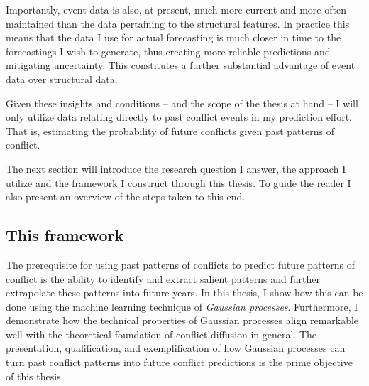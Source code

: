 \documentclass[a4paper]{article}
\begin{document}
Importantly, event data is also, at present, much more current and more often maintained than the data pertaining to the structural features. In practice this means that the data I use for actual forecasting is much closer in time to the forecastings I wish to generate, thus creating more reliable predictions and mitigating uncertainty. This constitutes a further substantial advantage of event data over structural data.\par

Given these insights and conditions -- and the scope of the thesis at hand -- I will only utilize data relating directly to past conflict events in my prediction effort. That is, estimating the probability of future conflicts given past patterns of conflict.\par

The next section will introduce the research question I answer, the approach I utilize and the framework I construct through this thesis. To guide the reader I also present an overview of the steps taken to this end.\par 


\subsection{This framework}

The prerequisite for using past patterns of conflicts to predict future patterns of conflict is the ability to identify and extract salient patterns and further extrapolate these patterns into future years. In this thesis, I show how this can be done using the machine learning technique of \emph{Gaussian processes}. Furthermore, I demonstrate how the technical properties of Gaussian processes align remarkable well with the theoretical foundation of conflict diffusion in general. The presentation, qualification, and exemplification of how Gaussian processes can turn past conflict patterns into future conflict predictions is the prime objective of this thesis.\par
\end{document}
